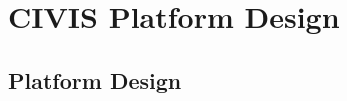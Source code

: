 
\section{CIVIS Platform Design}
\label{sec:CIVISdesign}




\subsection{Platform Design}
\label{sec:design}







